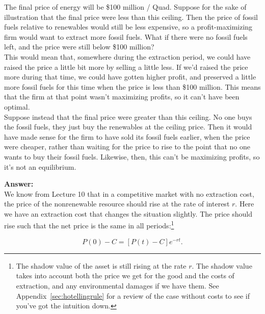 \begin{enumerate}
\begin{Exercise}
\begin{sol}
       The final price of energy will be \$100 million / Quad. Suppose for the sake of illustration that the final price were less than this ceiling. Then the price of fossil fuels relative to renewables would still be less expensive, so a profit-maximizing firm would want to extract more fossil fuels. What if there were no fossil fuels left, and the price were still below \$100 million?\\
       
       This would mean that, somewhere during the extraction period, we could have raised the price a little bit more by selling a little less. If we'd raised the price more during that time, we could have gotten higher profit, and preserved a little more fossil fuels for this time when the price is less than \$100 million. This means that the firm at that point wasn't maximizing profits, so it can't have been optimal.\\
       
       Suppose instead that the final price were greater than this ceiling. No one buys the fossil fuels, they just buy the renewables at the ceiling price. Then it would have made sense for the firm to have sold its fossil fuels earlier, when the price were cheaper, rather than waiting for the price to rise to the point that no one wants to buy their fossil fuels. Likewise, then, this can't be maximizing profits, so it's not an equilibrium.
     \end{sol}
     
     
    \begin{sol}
    \textbf{Answer:}\\
    
    We know from Lecture 10 that in a competitive market with no extraction cost, the price of the nonrenewable resource should rise at the rate of interest $r$. Here we have an extraction cost that changes the situation slightly. The price should rise such that the net price is the same in all periods:\footnote{The shadow value of the asset is still rising at the rate $r$. The shadow value takes into account both the price we get for the good and the costs of extraction, and any environmental damages if we have them. See Appendix~\ref{sec:hotellingrule} for a review of the case without costs to see if you've got the intuition down.}
    
     
    
        \begin{equation}
            P(0)-C = \left[P(t)-C\right]e^{-rt}.
            \label{eq:optext}
        \end{equation}
    

\end{sol}
\end{Exercise}
\end{enumerate}
